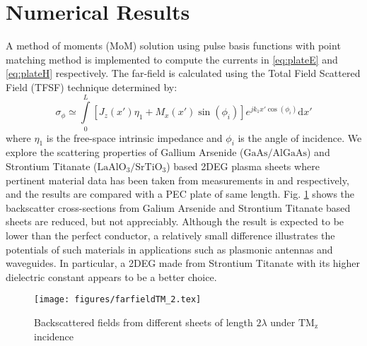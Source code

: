 \documentclass[conference, 10pt]{IEEEtran}
\renewcommand{\^}{\hat}  %
\begin{document}
\section{Numerical Results}
%
A method of moments (MoM) solution using pulse basis functions with point matching method is implemented to compute the currents in \eqref{eq:plateE} and \eqref{eq:plateH} respectively. The far-field is calculated using the Total Field Scattered Field (TFSF) technique determined by:
\begin{equation}
  \sigma_{\phi} \simeq \int \limits_{0}^{L} \left[J_z(x')\eta_1 + M_x(x')\sin(\phi_i)\right] e^{j k_1 x' \cos(\phi_i)} \mathrm{d}x'
  \label{eq:far-field}
\end{equation}
where $\eta_1$ is the free-space intrinsic impedance and $\phi_i$ is the angle of incidence.
%
We explore the scattering properties of Gallium Arsenide ($\mathrm{GaAs}/\mathrm{AlGaAs}$) and Strontium Titanate ($\mathrm{LaAlO_3}/\mathrm{SrTiO_3}$) based 2DEG plasma sheets where pertinent material data has been taken from measurements in \cite{burke2000high} and \cite{herranz2012high} respectively, and the results are compared with a PEC plate of same length. Fig. \ref{fig:rcs} shows the backscatter cross-sections from Galium Arsenide and Strontium Titanate based sheets are reduced, but not appreciably. Although the result is expected to be lower than the perfect conductor, a relatively small difference illustrates the potentials of such materials in applications such as plasmonic antennas and waveguides. In particular, a 2DEG made from Strontium Titanate with its higher dielectric constant appears to be a better choice.
%
\begin{figure}[h]
  \begin{center}
    \noindent
    \texttt{[image: figures/farfieldTM\_2.tex]}
    \caption{Backscattered fields from different sheets of length $2\lambda$ under $\mathrm{TM_z}$ incidence}
    \label{fig:rcs}
  \end{center}
\end{figure}
%
\end{document}
